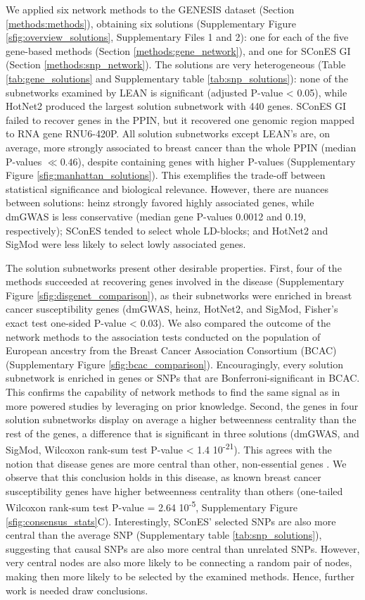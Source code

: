\documentclass[twocolumn, 10pt]{article}
\begin{document}
We applied six network methods to the GENESIS dataset (Section \ref{methods:methods}), obtaining six solutions (Supplementary Figure \ref{sfig:overview_solutions}, Supplementary Files 1 and 2): one for each of the five gene-based methods (Section \ref{methods:gene_network}), and one for SConES GI (Section \ref{methods:snp_network}). The solutions are very heterogeneous (Table \ref{tab:gene_solutions} and Supplementary table \ref{tab:snp_solutions}): none of the subnetworks examined by LEAN is significant (adjusted P-value < 0.05), while HotNet2 produced the largest solution subnetwork with 440 genes. SConES GI failed to recover genes in the PPIN, but it recovered one genomic region mapped to RNA gene RNU6-420P. All solution subnetworks except LEAN's are, on average, more strongly associated to breast cancer than the whole PPIN (median P-values $\ll 0.46$), despite containing genes with higher P-values (Supplementary Figure \ref{sfig:manhattan_solutions}). This exemplifies the trade-off between statistical significance and biological relevance. However, there are nuances between solutions: heinz strongly favored highly associated genes, while dmGWAS is less conservative (median gene P-values 0.0012 and 0.19, respectively); SConES tended to select whole LD-blocks; and HotNet2 and SigMod were less likely to select lowly associated genes. 

The solution subnetworks present other desirable properties. First, four of the methods succeeded at recovering genes involved in the disease (Supplementary Figure \ref{sfig:disgenet_comparison}), as their subnetworks were enriched in breast cancer susceptibility genes (dmGWAS, heinz, HotNet2, and SigMod, Fisher's exact test one-sided P-value < 0.03). We also compared the outcome of the network methods to the association tests conducted on the population of European ancestry from the Breast Cancer Association Consortium (BCAC) \cite{michailidou_genome-wide_2015} (Supplementary Figure \ref{sfig:bcac_comparison}). Encouragingly, every solution subnetwork is enriched in genes or SNPs that are Bonferroni-significant in BCAC. This confirms the capability of network methods to find the same signal as in more powered studies by leveraging on prior knowledge. Second, the genes in four solution subnetworks display on average a higher betweenness centrality than the rest of the genes, a difference that is significant in three solutions (dmGWAS, and SigMod, Wilcoxon rank-sum test P-value < 1.4 \texttimes{} 10\textsuperscript{-21}). This agrees with the notion that disease genes are more central than other, non-essential genes \cite{pinero_uncovering_2016}. We observe that this conclusion holds in this disease, as known breast cancer susceptibility genes have higher betweenness centrality than others (one-tailed Wilcoxon rank-sum test P-value = 2.64 \texttimes{} 10\textsuperscript{-5}, Supplementary Figure \ref{sfig:consensus_stats}C). Interestingly, SConES' selected SNPs are also more central than the average SNP (Supplementary table \ref{tab:snp_solutions}), suggesting that causal SNPs are also more central than unrelated SNPs. However, very central nodes are also more likely to be connecting a random pair of nodes, making then more likely to be selected by the examined methods. Hence, further work is needed draw conclusions.
\end{document}
